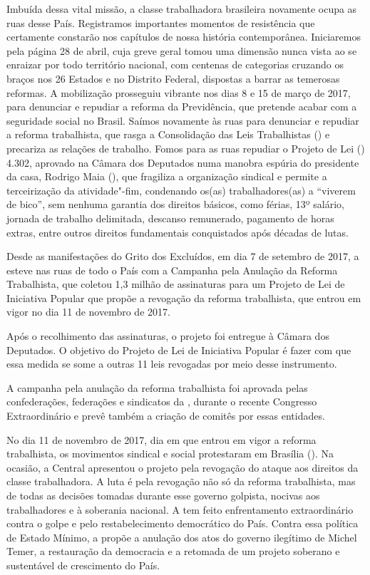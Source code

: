 Imbuída dessa vital missão, a classe trabalhadora brasileira novamente
ocupa as ruas desse País. Registramos importantes momentos de
resistência que certamente constarão nos capítulos de nossa história
contemporânea. Iniciaremos pela página 28 de abril, cuja greve geral
tomou uma dimensão nunca vista ao se enraizar por todo território
nacional, com centenas de categorias cruzando os braços nos 26 Estados e
no Distrito Federal, dispostas a barrar as temerosas reformas. A
mobilização prosseguiu vibrante nos dias 8 e 15 de março de 2017, para
denunciar e repudiar a reforma da Previdência, que pretende acabar com a
seguridade social no Brasil. Saímos novamente às ruas para denunciar e
repudiar a reforma trabalhista, que rasga a Consolidação das Leis
Trabalhistas () e precariza as relações de trabalho. Fomos para as
ruas repudiar o Projeto de Lei () 4.302, aprovado na Câmara dos
Deputados numa manobra espúria do presidente da casa, Rodrigo Maia (),
que fragiliza a organização sindical e permite a terceirização da
atividade"-fim, condenando os(as) trabalhadores(as) a ``viverem de
bico'', sem nenhuma garantia dos direitos básicos, como férias, 13º
salário, jornada de trabalho delimitada, descanso remunerado, pagamento
de horas extras, entre outros direitos fundamentais conquistados após
décadas de lutas.

Desde as manifestações do Grito dos Excluídos, em dia 7 de setembro de 2017, a  esteve nas ruas de todo o País com a Campanha pela Anulação da Reforma Trabalhista, que coletou 1,3 milhão de assinaturas para um Projeto de Lei de Iniciativa Popular que propõe a revogação da reforma trabalhista, que entrou em vigor no dia 11 de novembro de 2017. 

Após o recolhimento das assinaturas, o projeto foi entregue à Câmara dos Deputados. O objetivo do Projeto de Lei de Iniciativa Popular é fazer com que essa medida se some a outras 11 leis revogadas por meio desse instrumento. 

A campanha pela anulação da reforma trabalhista foi aprovada pelas confederações, federações e sindicatos da , durante o recente Congresso Extraordinário e prevê também a criação de comitês por essas entidades.

No dia 11 de novembro de 2017, dia em que entrou em vigor a reforma trabalhista, os movimentos sindical e social protestaram em Brasília (). Na ocasião, a Central apresentou o projeto pela revogação do ataque aos direitos da classe trabalhadora. A luta é pela revogação não só da reforma trabalhista, mas de todas as decisões tomadas durante esse governo golpista, nocivas aos trabalhadores e à soberania nacional. A  tem feito enfrentamento extraordinário contra o golpe e pelo restabelecimento democrático do País. Contra essa política de Estado Mínimo, a  propõe a anulação dos atos do governo ilegítimo de Michel Temer, a restauração da democracia e a retomada de um projeto soberano e sustentável de crescimento do País. 

